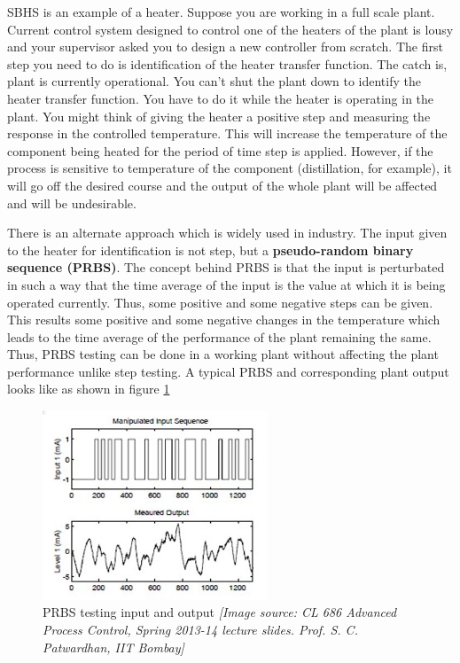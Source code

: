 SBHS is an example of a heater. Suppose you are working in a full scale plant. Current control system designed to control one of the heaters of the plant is lousy and your supervisor asked you to design a new controller from scratch. The first step you need to do is identification of the heater transfer function. The catch is, plant is currently
operational. You can't shut the plant down to identify the heater transfer function. You have to do it while the heater is operating in the plant. You might think of giving the heater a positive step and measuring the response in the controlled temperature. This will
increase the temperature of the component being heated for the period of time step is applied. However, if the process is sensitive to temperature of the component (distillation, for example), it will go off the desired course and the output of the whole plant will be affected and will be undesirable.

\vspace{12pt}

There is an alternate approach which is widely used in industry. The input given to the heater for identification is not step, but a \textbf{pseudo-random binary sequence (PRBS)}. The concept behind PRBS is that the input is perturbated in such a way that the time average of the input is the value at which it is being operated currently. Thus, some positive and some negative steps can be given. This results some positive and some negative changes in the temperature which leads to the time average of the performance of the plant remaining the same. Thus, PRBS testing can be done in a working plant without affecting the plant performance unlike step testing. A typical PRBS and corresponding plant output looks like as shown in figure \ref{sample-prbs}

\begin{figure}[H]
\begin{centering}
\includegraphics[width=0.6\textwidth]{prbs/PRBS}
\par\end{centering}

\caption{PRBS testing input and output \textit{{[}Image source: CL 686 Advanced
Process Control, Spring 2013-14 lecture slides. Prof. S. C. Patwardhan, IIT Bombay{]}}}
\label{sample-prbs}
\end{figure}


